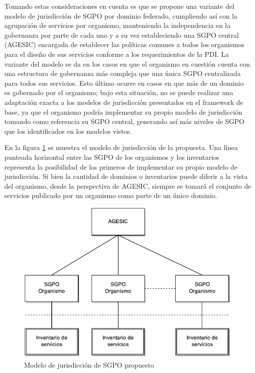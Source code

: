 \documentclass[11pt]{article}
\begin{document}
			Tomando estas consideraciones en cuenta es que se propone una variante del modelo de jurisdicción de SGPO por dominio federado, cumpliendo así con la agrupación de servicios por organismo, manteniendo la independencia en la gobernanza por parte de cada uno y a su vez estableciendo una SGPO central (AGESIC) encargada de establecer las políticas comunes a todos los organismos para el diseño de sus servicios conforme a los requerimientos de la PDI. La variante del modelo se da en los casos en que el organismo en cuestión cuenta con una estructura de gobernanza más compleja que una única SGPO centralizada para todos sus servicios. Esto último ocurre en casos en que más de un dominio es gobernado por el organismo; bajo esta situación, no se puede realizar una adaptación exacta a los modelos de jurisdicción presentados en el framework de base, ya que el organismo podría implementar su propio modelo de jurisdicción tomando como referencia su SGPO central, generando así más niveles de SGPO que los identificados en los modelos vistos.

			En la figura \ref{imagen:modelo_jurisdiccion_sgpo_propuesta} se muestra el modelo de jurisdicción de la propuesta. Una línea punteada horizontal entre las SGPO de los organismos y los inventarios representa la posibilidad de los primeros de implementar su propio modelo de jurisdicción. Si bien la cantidad de dominios o inventarios puede diferir a la vista del organismo, desde la perspectiva de AGESIC, siempre se tomará el conjunto de servicios publicado por un organismo como parte de un único dominio.

			\begin{figure}
				\centering
				\includegraphics[width=\linewidth]{modelo_jurisdiccion_sgpo_propuesta}
				\caption{Modelo de jurisdicción de SGPO propuesto}
				\label{imagen:modelo_jurisdiccion_sgpo_propuesta}
			\end{figure}
\end{document}
